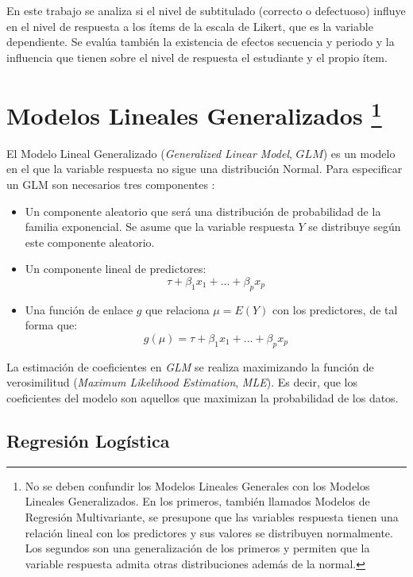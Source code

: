 \documentclass[
  12pt,
  a4paper,
  extrafontsizes,
  onecolumn,
  openright,
  table]{memoir}
\begin{document}
En este trabajo se analiza si el nivel de subtitulado (correcto o
defectuoso) influye en el nivel de respuesta a los ítems de la escala de
Likert, que es la variable dependiente. Se evalúa también la existencia
de efectos secuencia y periodo y la influencia que tienen sobre el nivel
de respuesta el estudiante y el propio ítem.

\hypertarget{sec-glm}{%
\section[Modelos Lineales Generalizados ]{\texorpdfstring{Modelos
Lineales Generalizados
\footnote{No se deben confundir los Modelos Lineales Generales con los
  Modelos Lineales Generalizados. En los primeros, también llamados
  Modelos de Regresión Multivariante, se presupone que las variables
  respuesta tienen una relación lineal con los predictores y sus valores
  se distribuyen normalmente. Los segundos son una generalización de los
  primeros y permiten que la variable respuesta admita otras
  distribuciones además de la normal.}}{Modelos Lineales Generalizados }}\label{sec-glm}}

El Modelo Lineal Generalizado (\emph{Generalized Linear Model}, \(GLM\))
es un modelo en el que la variable respuesta no sigue una distribución
Normal. Para especificar un \gls{GLM} son necesarios tres componentes
\autocite[ver][pp.~66-67]{agresti_2018}:

\begin{itemize}
\item
  Un componente aleatorio que será una distribución de probabilidad de
  la familia exponencial. Se asume que la variable respuesta \(Y\) se
  distribuye según este componente aleatorio.
\item
  Un componente lineal de predictores: \[
  \tau+\beta_1x_1+...+\beta_px_p
  \]
\item
  Una función de enlace \(g\) que relaciona \(\mu=E(Y)\) con los
  predictores, de tal forma que: \[
  g(\mu)=\tau+\beta_1x_1+...+\beta_px_p
  \]
\end{itemize}

La estimación de coeficientes en \emph{GLM} se realiza maximizando la
función de verosimilitud (\emph{Maximum Likelihood Estimation},
\emph{\gls{MLE}}). Es decir, que los coeficientes del modelo son
aquellos que maximizan la probabilidad de los datos.

\hypertarget{sec-logistica}{%
\subsection{Regresión Logística}\label{sec-logistica}}
\end{document}

